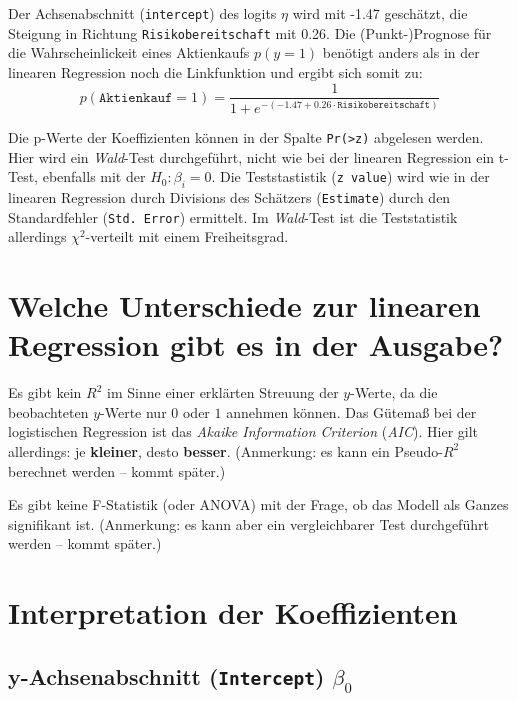 \documentclass[12pt,]{book}
\begin{document}
Der Achsenabschnitt (\texttt{intercept}) des logits \(\eta\) wird mit
-1.47 geschätzt, die Steigung in Richtung \texttt{Risikobereitschaft}
mit 0.26. Die (Punkt-)Prognose für die Wahrscheinlickeit eines
Aktienkaufs \(p(y=1)\) benötigt anders als in der linearen Regression
noch die Linkfunktion und ergibt sich somit zu:
\[p(\texttt{Aktienkauf}=1)=\frac{1}{1+e^{-(-1.47 + 0.26 \cdot \texttt{Risikobereitschaft})}}\]

Die p-Werte der Koeffizienten können in der Spalte
\texttt{Pr(\textgreater{}\textbar{}z\textbar{})} abgelesen werden. Hier
wird ein \emph{Wald}-Test durchgeführt, nicht wie bei der linearen
Regression ein t-Test, ebenfalls mit der \(H_0:\beta_i=0\). Die
Teststastistik (\texttt{z\ value}) wird wie in der linearen Regression
durch Divisions des Schätzers (\texttt{Estimate}) durch den
Standardfehler (\texttt{Std.\ Error}) ermittelt. Im \emph{Wald}-Test ist
die Teststatistik allerdings \(\chi^2\)-verteilt mit einem
Freiheitsgrad.

\section{Welche Unterschiede zur linearen Regression gibt es in der
Ausgabe?}\label{welche-unterschiede-zur-linearen-regression-gibt-es-in-der-ausgabe}

Es gibt kein \(R^2\) im Sinne einer erklärten Streuung der \(y\)-Werte,
da die beobachteten \(y\)-Werte nur \(0\) oder \(1\) annehmen können.
Das Gütemaß bei der logistischen Regression ist das \emph{Akaike
Information Criterion} (\emph{AIC}). Hier gilt allerdings: je
\textbf{kleiner}, desto \textbf{besser}. (Anmerkung: es kann ein
Pseudo-\(R^2\) berechnet werden -- kommt später.)

Es gibt keine F-Statistik (oder ANOVA) mit der Frage, ob das Modell als
Ganzes signifikant ist. (Anmerkung: es kann aber ein vergleichbarer Test
durchgeführt werden -- kommt später.)

\section{Interpretation der
Koeffizienten}\label{interpretation-der-koeffizienten}

\subsection{\texorpdfstring{y-Achsenabschnitt (\texttt{Intercept})
\(\beta_0\)}{y-Achsenabschnitt (Intercept) \textbackslash{}beta\_0}}\label{y-achsenabschnitt-intercept-beta_0}
\end{document}
